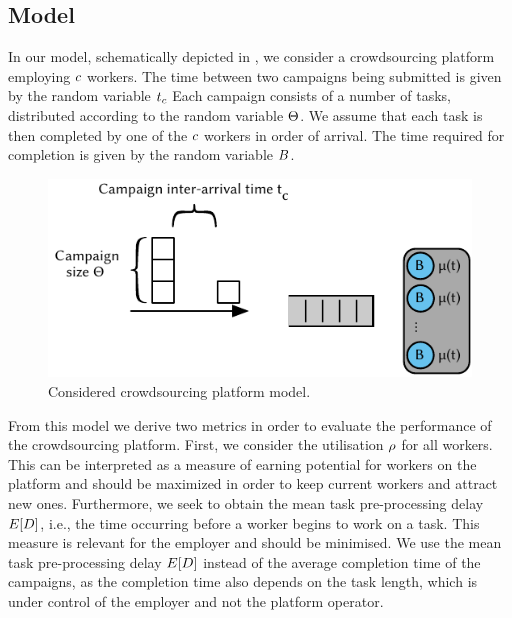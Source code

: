 \subsection{Model}\label{sec:cloud:crowdsourcing:model}

In our model, schematically depicted in , we consider a crowdsourcing  platform employing \(c\) workers.
The time between two campaigns being submitted is given by the random variable \(t_c\)
Each campaign consists of a number of tasks, distributed according to the random variable \(\Theta\).
We assume that each task is then completed by one of the \(c\) workers in order of arrival.
The time required for completion is given by the random variable \(B\).

\begin{figure}
  \centering
  \includegraphics{cloud/crowdsourcing/model/figures/model}
  \caption{Considered crowdsourcing platform model.}
  \label{fig:sec:cloud:crowdsourcing:model:model}
\end{figure}

From this model we derive two metrics in order to evaluate the performance of the crowdsourcing platform.
First, we consider the utilisation \(\rho\) for all workers.
This can be interpreted as a measure of earning potential for workers on the platform and should be maximized in order to keep current workers and attract new ones. 
Furthermore, we seek to obtain the mean task pre-processing delay \(E[D]\), i.e., the time occurring before a worker begins to work on a task.
This measure is relevant for the employer and should be minimised.
We use the mean task pre-processing delay \(E[D]\) instead of the average completion time of the campaigns, as the completion time also depends on the task length, which is under control of the employer and not the platform operator.

